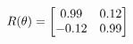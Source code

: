 \documentclass[preview]{standalone}
\begin{document}
\begin{align*}
\special{dvisvgm:raw <g id='unique000'>}R(\theta) = \begin{bmatrix}0.99 & 0.12\\-0.12 & 0.99\end{bmatrix}\special{dvisvgm:raw </g>}
\end{align*}
\end{document}
